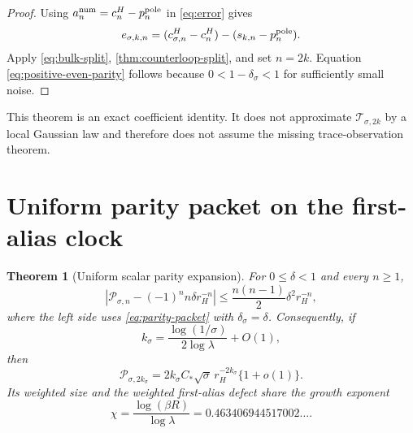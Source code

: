 \documentclass[11pt]{article}
\newtheorem{theorem}{Theorem}[section]
\theoremstyle{remark}
\newcommand{\1}{\mathbf 1}
\newcommand{\cP}{\mathcal P}
\newcommand{\cT}{\mathcal T}
\begin{document}
\begin{proof}
Using $a_n^{\rm num}=c^H_n-p_n^{\rm pole}$ in \eqref{eq:error} gives
\[
 e_{\sigma,k,n}=(c^H_{\sigma,n}-c^H_n)
 -(s_{k,n}-p_n^{\rm pole}).
\]
Apply \eqref{eq:bulk-split}, \cref{thm:counterloop-split}, and set $n=2k$.
Equation \eqref{eq:positive-even-parity} follows because
$0<1-\delta_\sigma<1$ for sufficiently small noise.
\end{proof}

This theorem is an exact coefficient identity.  It does not approximate
$\cT_{\sigma,2k}$ by a local Gaussian law and therefore does not assume the
missing trace-observation theorem.

\section{Uniform parity packet on the first-alias clock}

\begin{theorem}[Uniform scalar parity expansion]
\label{thm:parity-expansion}
For $0\le\delta<1$ and every $n\ge1$,
\begin{equation}
 \left|
 \cP_{\sigma,n}-(-1)^n n\delta r_H^{-n}
 \right|
 \le \frac{n(n-1)}2\delta^2r_H^{-n},
 \label{eq:uniform-remainder}
\end{equation}
where the left side uses \eqref{eq:parity-packet} with
$\delta_\sigma=\delta$.  Consequently, if
\begin{equation}
 k_\sigma=\frac{\log(1/\sigma)}{2\log\lambda}+O(1),
 \label{eq:natural-clock}
\end{equation}
then
\begin{equation}
 \cP_{\sigma,2k_\sigma}
 =2k_\sigma C_*\sqrt\sigma\,r_H^{-2k_\sigma}
 \{1+o(1)\}.
 \label{eq:moving-parity}
\end{equation}
Its weighted size and the weighted first-alias defect share the growth
exponent
\begin{equation}
 \chi=\frac{\log(\beta R)}{\log\lambda}
 =0.463406944517002\ldots .
 \label{eq:common-exponent}
\end{equation}
\end{theorem}
\end{document}
